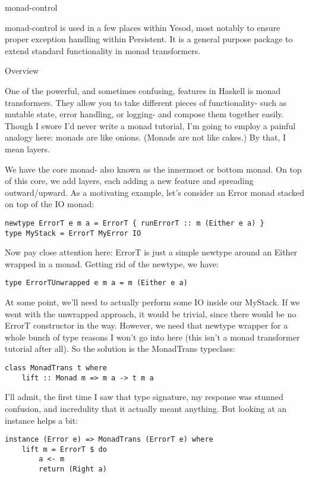 monad-control

monad-control is used in a few places within Yesod, most notably to ensure proper exception handling within Persistent. It is a general purpose package to extend standard functionality in monad transformers.

Overview

One of the powerful, and sometimes confusing, features in Haskell is monad transformers. They allow you to take different pieces of functionality- such as mutable state, error handling, or logging- and compose them together easily. Though I swore I'd never write a monad tutorial, I'm going to employ a painful analogy here: monads are like onions. (Monads are not like cakes.) By that, I mean layers.

We have the core monad- also known as the innermost or bottom monad. On top of this core, we add layers, each adding a new feature and spreading outward/upward. As a motivating example, let's consider an Error monad stacked on top of the IO monad:

\begin{lstlisting}
newtype ErrorT e m a = ErrorT { runErrorT :: m (Either e a) }
type MyStack = ErrorT MyError IO
\end{lstlisting}

Now pay close attention here: ErrorT is just a simple newtype around an Either wrapped in a monad. Getting rid of the newtype, we have:

\begin{lstlisting}
type ErrorTUnwrapped e m a = m (Either e a)
\end{lstlisting}

At some point, we'll need to actually perform some IO inside our MyStack. If we went with the unwrapped approach, it would be trivial, since there would be no ErrorT constructor in the way. However, we need that newtype wrapper for a whole bunch of type reasons I won't go into here (this isn't a monad transformer tutorial after all). So the solution is the MonadTrans typeclass:

\begin{lstlisting}
class MonadTrans t where
    lift :: Monad m => m a -> t m a
\end{lstlisting}

I'll admit, the first time I saw that type signature, my response was stunned confusion, and incredulity that it actually meant anything. But looking at an instance helps a bit:

\begin{lstlisting}
instance (Error e) => MonadTrans (ErrorT e) where
    lift m = ErrorT $ do
        a <- m
        return (Right a)
\end{lstlisting}

